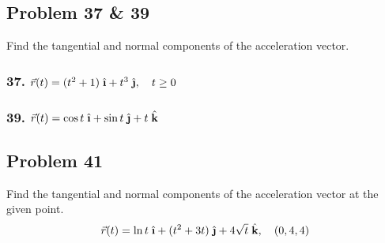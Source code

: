 \documentclass{article}
\newcommand{\ihat}{\;\hat{\textbf{\i}}}
\newcommand{\jhat}{\;\hat{\textbf{\j}}}
\newcommand{\khat}{\;\hat{\textbf{k}}}
\newcommand{\rvec}{\vec{r}(t)}
\begin{document}
\subsection*{Problem 37 \& 39}

Find the tangential and normal components of the acceleration vector.

\subsubsection*{37. $\rvec = (t^2 + 1)\ihat + t^3\jhat, \quad t \geq 0    $}
\subsubsection*{39. $\rvec = \cos t\ihat + \sin t\jhat + t\khat$}
\subsection*{Problem 41}

Find the tangential and normal components of the acceleration vector at the given point.
\[
    \rvec = \ln t\ihat + (t^2 + 3t)\jhat + 4\sqrt t\khat, \quad (0, 4, 4)
\]
\end{document}

